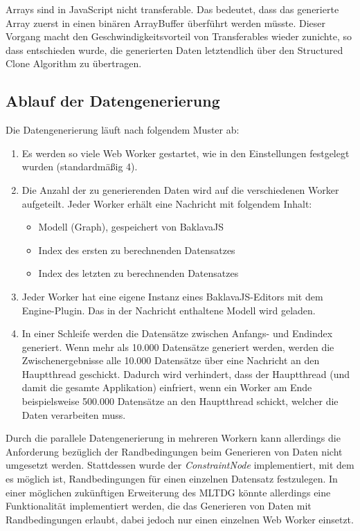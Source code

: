 Arrays sind in JavaScript nicht transferable. Das bedeutet, dass das generierte Array zuerst in einen binären ArrayBuffer überführt werden müsste. Dieser Vorgang macht den Geschwindigkeitsvorteil von Transferables wieder zunichte, so dass entschieden wurde, die generierten Daten letztendlich über den Structured Clone Algorithm zu übertragen.

\subsection{Ablauf der Datengenerierung}

Die Datengenerierung läuft nach folgendem Muster ab:

\begin{enumerate}
    \item Es werden so viele Web Worker gestartet, wie in den Einstellungen festgelegt wurden (standardmäßig 4).
    \item Die Anzahl der zu generierenden Daten wird auf die verschiedenen Worker aufgeteilt. Jeder Worker erhält eine Nachricht mit folgendem Inhalt:
    \begin{itemize}
        \item Modell (Graph), gespeichert von BaklavaJS
        \item Index des ersten zu berechnenden Datensatzes
        \item Index des letzten zu berechnenden Datensatzes
    \end{itemize}
    \item Jeder Worker hat eine eigene Instanz eines BaklavaJS-Editors mit dem Engine-Plugin. Das in der Nachricht enthaltene Modell wird geladen.
    \item In einer Schleife werden die Datensätze zwischen Anfangs- und Endindex generiert. Wenn mehr als 10.000 Datensätze generiert werden, werden die Zwischenergebnisse alle 10.000 Datensätze über eine Nachricht an den Hauptthread geschickt. Dadurch wird verhindert, dass der Hauptthread (und damit die gesamte Applikation) einfriert, wenn ein Worker am Ende beispielsweise 500.000 Datensätze an den Hauptthread schickt, welcher die Daten verarbeiten muss.
\end{enumerate}

Durch die parallele Datengenerierung in mehreren Workern kann allerdings die Anforderung bezüglich der Randbedingungen beim Generieren von Daten nicht umgesetzt werden. Stattdessen wurde der \textit{ConstraintNode} implementiert, mit dem es möglich ist, Randbedingungen für einen einzelnen Datensatz festzulegen. In einer möglichen zukünftigen Erweiterung des \ac{MLTDG} könnte allerdings eine Funktionalität implementiert werden, die das Generieren von Daten mit Randbedingungen erlaubt, dabei jedoch nur einen einzelnen Web Worker einsetzt.

